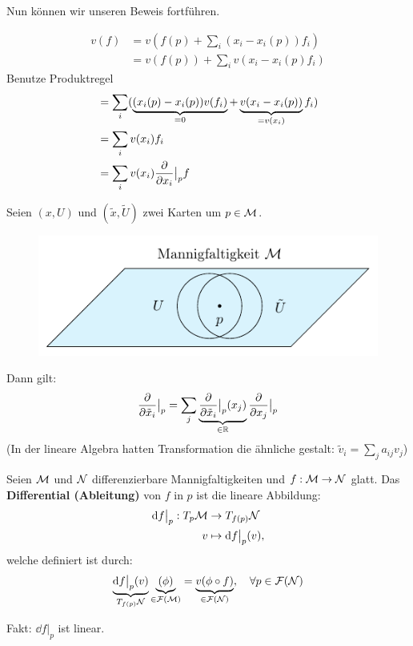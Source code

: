 Nun können wir unseren Beweis fortführen.

\begin{bew} \leavevmode
\begin{align}
v(f) &= v(f(p) + \sum_i (x_i - x_i(p)) f_i) \\
&= v(f(p)) + \sum_i v(x_i - x_i (p) f_i)
\end{align}
Benutze Produktregel
\begin{align}
&= \sum_i (\underbrace{(x_i (p) - x_i (p)) v(f_i)}_{=0} + \underbrace{v(x_i - x_i (p))}_{=v(x_i)} f_i) \\
&= \sum_i v(x_i) f_i \\
&= \sum_i v(x_i) \pdv{x_i} \big\vert_p f 
\end{align}
\end{bew}


\begin{satz}[Transformationsregel]
Seien $(x, U)$ und $(\tilde{x}, \tilde{U})$ zwei Karten um $p \in \mathcal{M}$. 
\begin{figure}[H]
\centering
\includegraphics[scale=1.0]{figures/tikz/transformationlaw.pdf}
\label{img:transformationsregel}
\end{figure} 

Dann gilt:
\begin{align}
\pdv{\tilde{x}_i} \big\vert_p  = \sum_j \underbrace{\pdv{\tilde{x}_i} \big\vert_p  (x_j)}_{\in \mathbb{R}} \pdv{x_j} \big\vert_p 
\end{align}
(In der lineare Algebra hatten Transformation die ähnliche gestalt: $\tilde{v}_i = \sum_j a_{i j } v_j$)
\end{satz}


\begin{defs}
Seien $\mathcal{M}$ und $\mathcal{N}$ differenzierbare Mannigfaltigkeiten und $f: \mathcal{M} \to \mathcal{N}$ glatt.
Das \textbf{Differential (Ableitung)} von $f$ in $p$ ist die lineare Abbildung:
\begin{align}
\dd f \big\vert_p : T_{p} \mathcal{M} &\to T_{f(p)}\mathcal{N} \\
v &\mapsto \dd f \big\vert_p (v),
\end{align}
welche definiert ist durch:
\begin{align}
\underbrace{\dd f \big\vert_p (v)}_{T_{f(p)}\mathcal{N}} \underbrace{(\phi)}_{\in \mathcal{F}(\mathcal{M})} = \underbrace{v(\phi \circ f)}_{\in \mathcal{F}(\mathcal{N})}, \quad \forall p \in \mathcal{F}(\mathcal{N})
\end{align}
\end{defs}
Fakt: $\dd f \big\vert_p$ ist linear.

